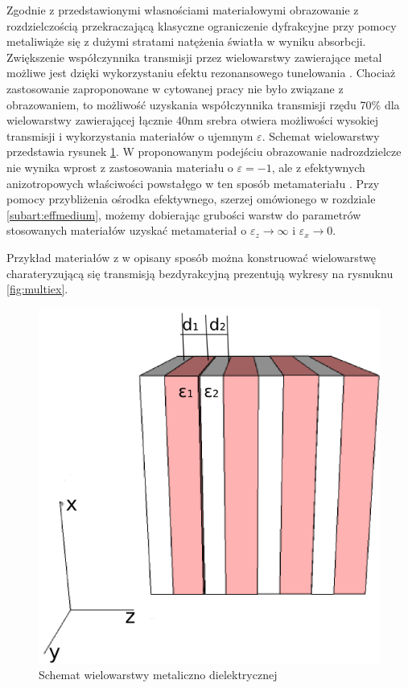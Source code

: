 Zgodnie z przedstawionymi własnościami materiałowymi obrazowanie z rozdzielczością przekraczającą klasyczne ograniczenie dyfrakcyjne przy pomocy metaliwiąże się z dużymi stratami natężenia światła w wyniku absorbcji. Zwiększenie współczynnika transmisji przez wielowarstwy zawierające metal możliwe jest dzięki wykorzystaniu efektu rezonansowego tunelowania \cite{scalora-transparentmetal}. Chociaż zastosowanie zaproponowane w cytowanej pracy nie było związane z obrazowaniem, to możliwość uzyskania współczynnika transmisji rzędu 70\% dla wielowarstwy zawierającej łącznie 40nm srebra otwiera możliwości wysokiej transmisji i wykorzystania materiałów o ujemnym $\varepsilon$. Schemat wielowarstwy przedstawia rysunek \ref{fig:mulschem}. W proponowanym podejściu obrazowanie nadrozdzielcze nie wynika wprost z zastosowania materiału o $\varepsilon = -1$, ale z efektywnych anizotropowych właściwości powstałęgo w ten sposób  metamateriału \cite{ramakrishna2003imaging}. Przy pomocy przybliżenia ośrodka efektywnego, szerzej omówionego w rozdziale \ref{subart:effmedium}, możemy dobierając grubości warstw do parametrów stosowanych materiałów uzyskać metamateriał o $\varepsilon_z \to \infty$ i $\varepsilon_x \to 0$.

Przykład materiałów z w opisany sposób można konstruować wielowarstwę charateryzującą się transmisją bezdyrakcyjną prezentują wykresy na rysnuknu \ref{fig:multiex}.




\begin{figure}[tb]
	\includegraphics[width=.5\textwidth]{images/multilayer/multilayer-3d.png}
	\caption{Schemat wielowarstwy metaliczno dielektrycznej}
	\label{fig:mulschem}
\end{figure}

